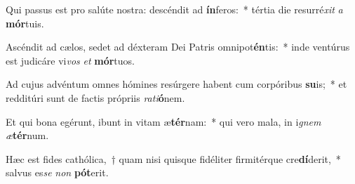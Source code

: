 \item Qui passus est pro salúte nostra: descéndit ad \textbf{ín}feros:~* tértia die resurré\textit{xit} \textit{a} \textbf{mór}tuis.
\item Ascéndit ad cælos, sedet ad déxteram Dei Patris omnipot\textbf{én}tis:~* inde ventúrus est judicáre vi\textit{vos} \textit{et} \textbf{mór}tuos.
\item Ad cujus advéntum omnes hómines resúrgere habent cum corpóribus \textbf{su}is;~* et redditúri sunt de factis própriis \textit{ra}\textit{ti}\textbf{ó}nem.
\item Et qui bona egérunt, ibunt in vitam æ\textbf{tér}nam:~* qui vero mala, in i\textit{gnem} \textit{æ}\textbf{tér}num.
\item Hæc est fides cathólica,~† quam nisi quisque fidéliter firmitérque cre\textbf{dí}derit,~* salvus es\textit{se} \textit{non} \textbf{pót}erit.
